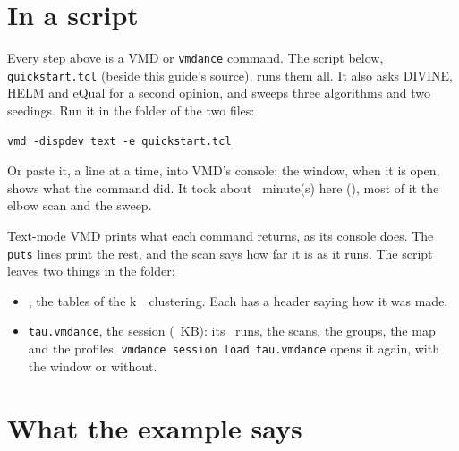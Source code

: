\documentclass[11pt,letterpaper]{article}
\newcommand{\file}[1]{\path{#1}}
\newcommand{\cmd}[1]{\texttt{#1}}
\begin{document}
\section{In a script}
\label{sec:script}

Every step above is a VMD or \cmd{vmdance} command. The script below,
\cmd{quickstart.tcl} (beside this guide's source), runs them all. It also
asks DIVINE, HELM and eQual for a second opinion, and sweeps three algorithms
and two seedings. Run it in the folder of the two files:

\begin{lstlisting}[style=sh]
vmd -dispdev text -e quickstart.tcl
\end{lstlisting}

Or paste it, a line at a time, into VMD's console: the window, when it is
open, shows what the command did. It took about \qsMinutes\ minute(s) here
(\qsMachine), most of it the elbow scan and the sweep.



Text-mode VMD prints what each command returns, as its console does. The
\cmd{puts} lines print the rest, and the scan says how far it is as it runs.
The script leaves two things in the folder:

\begin{itemize}
  \item \file{tau_results}, the tables of the k~\qsK\ clustering. Each has a
    header saying how it was made.\\
    {\raggedright\small\ttfamily\qsExportFiles\par}
  \item \cmd{tau.vmdance}, the session (\qsSessionKB\ KB): its \qsRuns\ runs,
    the scans, the groups, the map and the profiles. \cmd{vmdance session load
    tau.vmdance} opens it again, with the window or without.
\end{itemize}

\section{What the example says}
\label{sec:reading}
\end{document}
